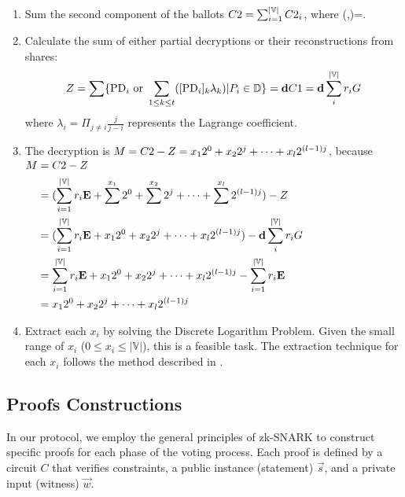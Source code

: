 \documentclass[runningheads]{llncs}
\begin{document}
\begin{enumerate}
    \item Sum the second component of the ballots $C2 = \sum_{i=1}^{|\mathbb{V}|} C2_{i}$, where (,)=.
    
    \item Calculate the sum of either partial decryptions or their reconstructions from shares: \[Z = \sum\{\mathrm{PD}_{i} \textrm{ or } \sum_{1 \leq k \leq t}([\mathrm{PD}_{i}]_{k} \lambda_{k}) | P_{i} \in \mathbb{D}\} = \textbf{d}{} C1 = \mathbf{d} \sum_i^{|\mathbb{V}|} r_i G \] where $\lambda_{i}=\Pi_{j \neq i}\frac{j}{j-i}$ represents the Lagrange coefficient.

    \item The decryption is $M=C2{} - Z=x_1 2^0 + x_2 2^j + \dots + x_l 2^{(l-1)j}$, because $\begin{aligned} M&=C2-Z \\
        &= (\sum_{i=1}^{|\mathbb{V}|} r_{i} \mathbf{E} + \sum^{x_1} 2^0 + \sum^{x_2} 2^j + \dots + \sum^{x_l} 2^{(l-1)j}) - Z\\
        &= (\sum_{i=1}^{|\mathbb{V}|} r_{i} \mathbf{E} + x_1 2^0 + x_2 2^j + \dots + x_l 2^{(l-1)j}) - \mathbf{d} \sum_i^{|\mathbb{V}|{}} r_i G \\
        &= \sum_{i=1}^{|\mathbb{V}|} r_{i} \mathbf{E} + x_1 2^0 + x_2 2^j + \dots + x_l 2^{(l-1)j} - \sum_{i=1}^{|\mathbb{V}|} r_{i} \mathbf{E}\\
        &= x_1 2^0 + x_2 2^j + \dots + x_l 2^{(l-1)j}\\
        \end{aligned}$
    
    \item Extract each $x_i$ by solving the Discrete Logarithm Problem. Given the small range of $x_i$ ($0 \leq x_i \leq |\mathbb{V}|$), this is a feasible task. The extraction technique for each $x_i$ follows the method described in \cite{haoAnonymousVotingTworound2010}.
\end{enumerate}





\subsection{Proofs Constructions}\label{sec:proofs}

In our protocol, we employ the general principles of zk-SNARK to construct specific proofs for each phase of the voting process. Each proof is defined by a circuit $C$ that verifies constraints, a public instance (statement) $\vec{s}$, and a private input (witness) $\vec{w}$.
\end{document}
